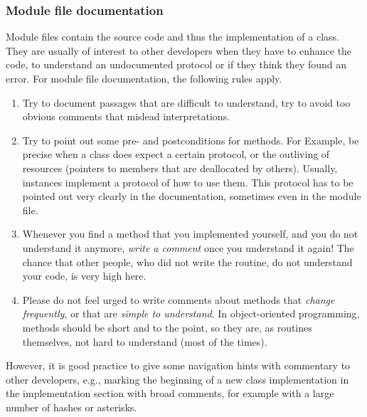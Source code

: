 \subsubsection{Module file documentation}
Module files contain the source code and thus the implementation of a class. They are usually of interest to other developers when they have to enhance the code, to understand an undocumented protocol or if they think they found an error.
For module file documentation, the following rules apply.
\begin{enumerate}
\item Try to document passages that are difficult to understand, try to avoid too obvious comments that mislead interpretations.
\item Try to point out some pre- and postconditions for methods. 
For Example, be precise when a class does expect a certain protocol, or the outliving of resources (pointers to members that are deallocated by others).
Usually, instances implement a protocol of how to use them.
This protocol has to be pointed out very clearly in the documentation, sometimes even in the module file.
\item Whenever you find a method that you implemented yourself, and you do not understand it anymore, \emph{write a comment} once you understand it again!
The chance that other people, who did not write the routine, do not understand your code, is very high here.
\item Please do not feel urged to write comments about methods that \emph{change frequently}, or that are \emph{simple to understand}.
In object-oriented programming, methods should be short and to the point, so they are, as routines themselves, not hard to understand (most of the times).
\end{enumerate}
However, it is good practice to give some navigation hints with commentary to other developers, e.g., marking the beginning of a new class implementation in the implementation section with broad comments, for example with a large number of hashes or asterisks.

